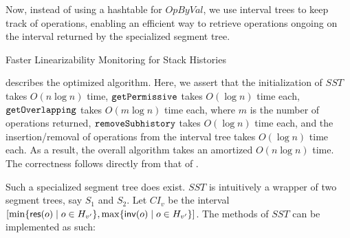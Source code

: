 Now, instead of using a hashtable for $OpByVal$, we use interval trees to keep track of operations, enabling an efficient way to retrieve operations ongoing on the interval returned by the specialized segment tree.

\begin{algorithm}[t]
\caption{Faster Linearizability Monitoring for Stack Histories}
\end{algorithm}

 describes the optimized algorithm. Here, we assert that the initialization of $SST$ takes $O(n \log{n})$ time, ${\tt getPermissive}$ takes $O(\log{n})$ time each, ${\tt getOverlapping}$ takes $O(m \log{n})$ time each, where $m$ is the number of operations returned, ${\tt removeSubhistory}$ takes $O(\log{n})$ time each, and the insertion/removal of operations from the interval tree takes $O(\log{n})$ time each. As a result, the overall algorithm takes an amortized $O(n \log{n})$ time. The correctness follows directly from that of .

Such a specialized segment tree does exist. $SST$ is intuitively a wrapper of two segment trees, say $S_1$ and $S_2$. Let $CI_v$ be the interval $[\min\{{\sf res}(o)\;|\;o\in H_{v'}\}, \max\{{\sf inv}(o)\;|\;o\in H_{v'}\}]$. The methods of $SST$ can be implemented as such:

